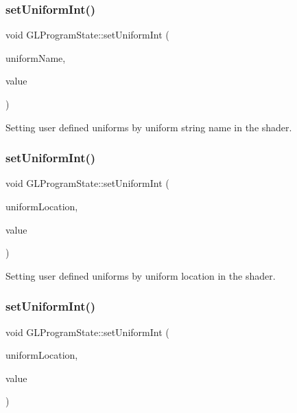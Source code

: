 \subsubsection{\texorpdfstring{set\+Uniform\+Int()}{setUniformInt()}\hspace{0.1cm}{\footnotesize\ttfamily [2/4]}}
{\footnotesize\ttfamily void G\+L\+Program\+State\+::set\+Uniform\+Int (\begin{DoxyParamCaption}\item[{const std\+::string \&}]{uniform\+Name,  }\item[{int}]{value }\end{DoxyParamCaption})}

Setting user defined uniforms by uniform string name in the shader. \mbox{\label{classGLProgramState_adb5469ae785904fc233ddc37ea6af9c6}} 
\subsubsection{\texorpdfstring{set\+Uniform\+Int()}{setUniformInt()}\hspace{0.1cm}{\footnotesize\ttfamily [3/4]}}
{\footnotesize\ttfamily void G\+L\+Program\+State\+::set\+Uniform\+Int (\begin{DoxyParamCaption}\item[{G\+Lint}]{uniform\+Location,  }\item[{int}]{value }\end{DoxyParamCaption})}

Setting user defined uniforms by uniform location in the shader. \mbox{\label{classGLProgramState_adb5469ae785904fc233ddc37ea6af9c6}} 
\subsubsection{\texorpdfstring{set\+Uniform\+Int()}{setUniformInt()}\hspace{0.1cm}{\footnotesize\ttfamily [4/4]}}
{\footnotesize\ttfamily void G\+L\+Program\+State\+::set\+Uniform\+Int (\begin{DoxyParamCaption}\item[{G\+Lint}]{uniform\+Location,  }\item[{int}]{value }\end{DoxyParamCaption})}

